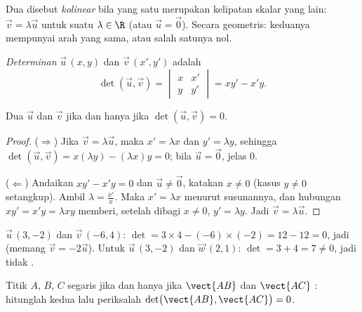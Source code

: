 \begin{definition}\label{def:g11:vect:collinear}
Dua  disebut \emph{kolinear} bila yang satu
merupakan kelipatan skalar yang lain: $\vec v = \lambda \vec u$ untuk suatu
$\lambda \in \R$ (atau $\vec u = \vec 0$). Secara geometris: keduanya mempunyai
arah yang sama, atau salah satunya nol.
\end{definition}

\begin{definition}[Determinan]\label{def:g11:vect:det}
\emph{Determinan} $\vec u\,(x, y)$ dan
$\vec v\,(x', y')$ adalah
\[
\det(\vec u, \vec v) =
\begin{vmatrix} x & x' \\ y & y' \end{vmatrix}
= x y' - x' y .
\]
\end{definition}

\begin{theorem}\label{thm:g11:vect:collinearity}
Dua  $\vec u$ dan $\vec v$  jika dan hanya jika
$\det(\vec u, \vec v) = 0$.
\end{theorem}

\begin{proof}
($\Rightarrow$) Jika $\vec v = \lambda\vec u$, maka $x' = \lambda x$ dan
$y' = \lambda y$, sehingga
$\det(\vec u, \vec v) = x(\lambda y) - (\lambda x)y = 0$; bila
$\vec u = \vec 0$,  jelas $0$.

($\Leftarrow$) Andaikan $xy' - x'y = 0$ dan $\vec u \neq \vec 0$, katakan
$x \neq 0$ (kasus $y \neq 0$ setangkup). Ambil
$\lambda = \frac{x'}{x}$. Maka $x' = \lambda x$ menurut susunannya, dan
hubungan $xy' = x'y = \lambda x y$ memberi, setelah dibagi $x \neq 0$,
$y' = \lambda y$. Jadi $\vec v = \lambda \vec u$.
\end{proof}

\begin{example}\label{ex:g11:vect:collinear}
$\vec u\,(3, -2)$ dan $\vec v\,(-6, 4)$:
$\det = 3 \times 4 - (-6) \times (-2) = 12 - 12 = 0$, jadi  (memang
$\vec v = -2\vec u$). Untuk $\vec u\,(3, -2)$ dan $\vec w\,(2, 1)$:
$\det = 3 + 4 = 7 \neq 0$, jadi tidak .
\end{example}

\begin{method}\label{met:g11:vect:alignment}
Titik $A$, $B$, $C$ segaris jika dan hanya jika $\vect{AB}$ dan $\vect{AC}$
: hitunglah kedua  lalu periksalah
$\det\bigl(\vect{AB}, \vect{AC}\bigr) = 0$.
\end{method}

